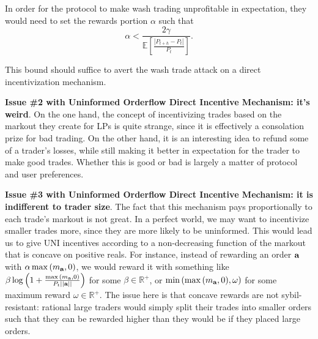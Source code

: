     In order for the protocol to make wash trading unprofitable in expectation, they would need to set the rewards portion $\alpha$ such that
        \begin{equation}
            \alpha < \frac{2\gamma }{\mathbb E \left[ \frac{|P_{t+h} - P_t|}{P_t} \right]}.
        \end{equation}
    
    This bound should suffice to avert the wash trade attack on a direct incentivization mechanism.
    
    
    \textbf{Issue \#2 with Uninformed Orderflow Direct Incentive Mechanism: it's weird}.
    On the one hand, the concept of incentivizing trades based on the markout they create for LPs is quite strange, since it is effectively a consolation prize for bad trading. On the other hand, it is an interesting idea to refund some of a trader's losses, while still making it better in expectation for the trader to make good trades. Whether this is good or bad is largely a matter of protocol and user preferences.

    \textbf{Issue \#3 with Uninformed Orderflow Direct Incentive Mechanism: it is indifferent to trader size}.
    The fact that this mechanism pays proportionally to each trade's markout is not great. In a perfect world, we may want to incentivize smaller trades more, since they are more likely to be uninformed. This would lead us to give UNI incentives according to a non-decreasing function of the markout that is concave on positive reals. For instance, instead of rewarding an order $\textbf a$ with $\alpha \max{(m_{\textbf a}, 0)}$, we would reward it with something like $\beta \log \left(1 + \frac{\max{(m_{\textbf a}, 0)}}{P_t ||\textbf a||} \right)$ for some $\beta \in \mathbb R^+$, or $\min{ ( \max{(m_{\textbf a}, 0)}, \omega )}$ for some maximum reward $\omega \in \mathbb R^+$. The issue here is that concave rewards are not sybil-resistant: rational large traders would simply split their trades into smaller orders such that they can be rewarded higher than they would be if they placed large orders.%
    
